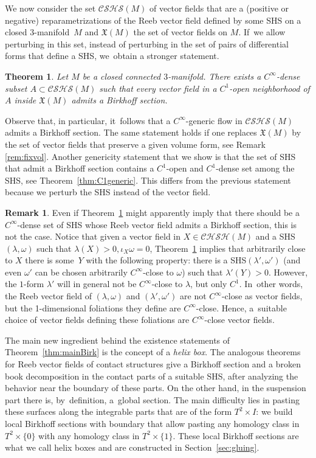 \documentclass[11pt]{article}
\newcommand{\threemanifold}{$3$\nobreakdash-mani\-fold\xspace}
\newtheorem{thm}{Theorem}
\theoremstyle{definition}
\newtheorem{Remark}[theorem]{Remark}
\begin{document}
We now consider the set $\mathcal{CSHS}(M)$ of vector fields that are a (positive or negative) reparametrizations of the Reeb vector field defined by some SHS on a closed \threemanifold~$M$ and $\mathfrak{X}(M)$ the set of vector fields on $M$. If~we allow perturbing in this set, instead of perturbing in the set of pairs of differential forms that define a SHS, we~obtain a stronger statement.

\begin{thm}\label{thm:generic}
Let $M$ be a closed connected \threemanifold. There exists a $C^\infty$-dense subset $A\subset \mathcal{CSHS}(M)$ such that every vector field in a $C^1$-open neighborhood of $A$ inside $\mathfrak{X}(M)$ admits a Birkhoff section.
\end{thm}

Observe that, in particular, it~follows that a $C^\infty$-generic flow in $\mathcal{CSHS}(M)$ admits a Birkhoff section. The same statement holds if one replaces $\mathfrak{X}(M)$ by the set of vector fields that preserve a given volume form, see Remark \ref{rem:fixvol}. Another genericity statement that we show is that the set of SHS that admit a Birkhoff section contains a $C^1$-open and $C^1$-dense set among the SHS, see Theorem~\ref{thm:C1generic}. This differs from the previous statement because we perturb the SHS instead of the vector field.

\begin{Remark}
Even if Theorem~\ref{thm:generic} might apparently imply that there should be a $C^\infty$-dense set of SHS whose Reeb vector field admits a Birkhoff section, this is not the case. Notice that given a vector field in $X\in \mathcal{CHSH}(M)$ and a SHS $(\lambda,\omega)$ such that $\lambda(X)>0, \iota_X\omega=0$, Theorem~\ref{thm:generic} implies that arbitrarily close to $X$ there is some~$Y$ with the following property: there is a SHS$(\lambda',\omega')$ (and even $\omega'$ can be chosen arbitrarily $C^\infty$-close to $\omega$) such that $\lambda'(Y)>0$. However, the $1$-form $\lambda'$ will in general not be $C^\infty$-close to $\lambda$, but only $C^1$. In~other words, the Reeb vector field of $(\lambda,\omega)$ and $(\lambda',\omega')$ are not $C^\infty$-close as vector fields, but the 1-dimensional foliations they define are $C^\infty$-close. Hence, a~suitable choice of vector fields defining these foliations are $C^\infty$-close vector fields.
\end{Remark}

The main new ingredient behind the existence statements of Theorem~\ref{thm:mainBirk} is the concept of a \emph{helix box}. The analogous theorems for Reeb vector fields of contact structures give a Birkhoff section and a broken book decomposition in the contact parts of a suitable SHS, after analyzing the behavior near the boundary of these parts. On the other hand, in the suspension part there is, by~definition, a~global section. The main difficulty lies in pasting these surfaces along the integrable parts that are of the form $T^2\times I$: we build local Birkhoff sections with boundary that allow pasting any homology class in $T^2\times\{0\}$ with any homology class in $T^2\times\{1\}$. These local Birkhoff sections are what we call helix boxes and are constructed in Section~\ref{sec:gluing}.
\end{document}
